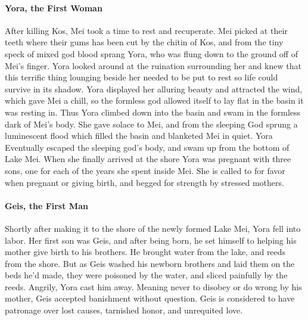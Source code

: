 \paragraph{Yora, the First Woman}
After killing Kos, Mei took a time to rest and recuperate. Mei picked at their teeth where their gums has been cut by the chitin of Kos, and from the tiny speck of mixed god blood sprang Yora, who was flung down to the ground off of Mei’s finger. Yora looked around at the ruination surrounding her and knew that this terrific thing lounging beside her needed to be put to rest so life could survive in its shadow. Yora displayed her alluring beauty and attracted the wind, which gave Mei a chill, so the formless god allowed itself to lay flat in the basin it was resting in. Thus Yora climbed down into the basin and swam in the formless dark of Mei’s body. She gave solace to Mei, and from the sleeping God sprung a luminescent flood which filled the basin and blanketed Mei in quiet. Yora Eventually escaped the sleeping god’s body, and swam up from the bottom of Lake Mei. When she finally arrived at the shore Yora was pregnant with three sons, one for each of the years she spent inside Mei. She is called to for favor when pregnant or giving birth, and begged for strength by stressed mothers.

\paragraph{Geis, the First Man}
Shortly after making it to the shore of the newly formed Lake Mei, Yora fell into labor. Her first son was Geis, and after being born, he set himself to helping his mother give birth to his brothers. He brought water from the lake, and reeds from the shore. But as Geis washed his newborn brothers and laid them on the beds he’d made, they were poisoned by the water, and sliced painfully by the reeds. Angrily, Yora cast him away. Meaning never to disobey or do wrong by his mother, Geis accepted banishment without question. Geis is considered to have patronage over lost causes, tarnished honor, and unrequited love.


